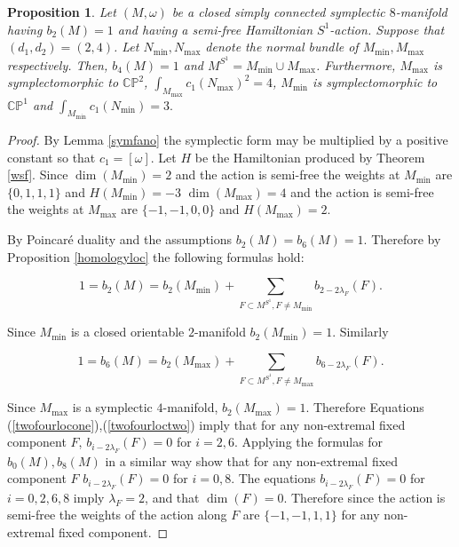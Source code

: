 \documentclass[12pt]{article}
\newtheorem{proposition}[theorem]{Proposition}
\begin{document}
\begin{proposition} \label{twofourcase}
Let $(M,\omega)$ be a closed simply connected symplectic $8$-manifold having $b_{2}(M)=1$ and having a semi-free Hamiltonian $S^1$-action. Suppose that $(d_1,d_2) = (2,4)$. Let $N_{\min},N_{\max}$ denote the normal bundle of $M_{\min},M_{\max}$ respectively.  Then, $b_{4}(M)=1$ and $M^{S^1}=M_{\min} \cup M_{\max}$. Furthermore, $M_{\max}$ is symplectomorphic to $\mathbb{CP}^2$, $\int_{M_{\max}} c_{1}(N_{\max})^2 = 4$, $M_{\min}$ is symplectomorphic to $\mathbb{CP}^1$ and $\int_{M_{\min}} c_{1}(N_{\min}) = 3.$ 

\end{proposition}
\begin{proof}

By Lemma \ref{symfano} the symplectic form may be multiplied by a positive constant so that $c_1 = [\omega]$. Let $H$ be the Hamiltonian produced by Theorem \ref{wsf}. Since $\dim(M_{\min}) = 2$ and the action is semi-free the weights at $M_{\min}$ are $\{0,1,1,1\}$ and $H(M_{\min}) = -3$ $\dim(M_{\max}) = 4$ and the action is semi-free the weights at $M_{\max}$ are $\{-1,-1,0,0\}$  and $H(M_{\max}) = 2$. 

By Poincar\'{e} duality and the assumptions $b_{2}(M)=b_{6}(M)=1$. Therefore by Proposition \ref{homologyloc} the following formulas hold: 

\begin{equation} \label{twofourlocone}  
1= b_{2}(M) = b_{2}(M_{\min}) +  \sum_{F \subset M^{S^1}, F \neq M_{\min}} b_{2-2\lambda_{F}}(F).  \end{equation}

Since $M_{\min}$ is a closed orientable $2$-manifold $b_{2}(M_{\min}) = 1$. Similarly


\begin{equation} \label{twofourloctwo}  
1= b_{6}(M) = b_{2}(M_{\max}) +  \sum_{F \subset M^{S^1}, F \neq M_{\max}} b_{6-2\lambda_{F}}(F).  \end{equation}


Since $M_{\max}$ is a symplectic $4$-manifold, $b_{2}(M_{\max})=1$. Therefore Equations (\ref{twofourlocone}),(\ref{twofourloctwo}) imply that for any non-extremal fixed component $F$, $b_{i-2\lambda_{F}}(F) = 0$ for $i=2,6$.  Applying the formulas for $b_{0}(M),b_{8}(M)$ in a similar way show that for any non-extremal fixed component $F$ $b_{i-2\lambda_{F}}(F) = 0$ for $i=0,8$.  The equations  $b_{i-2\lambda_{F}}(F) = 0$ for $i=0,2,6,8$ imply $\lambda_{F}=2$, and that $\dim(F)=0$.   Therefore since the action is semi-free the weights of the action along $F$ are $\{-1,-1,1,1\}$ for any non-extremal fixed component.


\end{proof}
\end{document}
